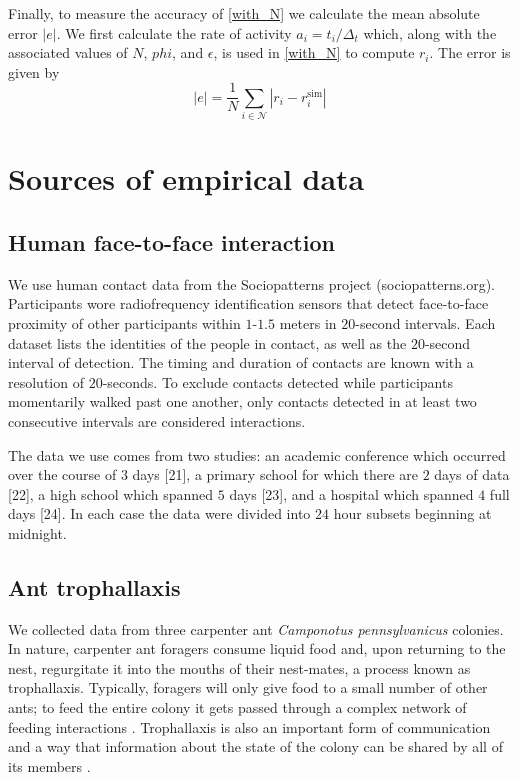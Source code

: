 \documentclass[twocolumn,8pt]{article}
\begin{document}
Finally, to measure the accuracy of \eqref{with_N} we calculate the mean absolute error $|e|$. We first calculate the rate of activity $a_{i}=t_{i}/\Delta_{t}$ which, along with the associated values of $N$, $phi$, and $\epsilon$, is used in \eqref{with_N} to compute $r_{i}$. The error is given by 
\begin{equation}
|e|=\frac{1}{N}\sum_{i\in\mathcal{N}}|r_{i}-r_{i}^{\text{sim}}|
\end{equation}

\section{Sources of empirical data}
\label{data}
\subsection{Human face-to-face interaction}
We use human contact data from the Sociopatterns project (sociopatterns.org). Participants wore radiofrequency identification sensors that detect face-to-face proximity of other participants within $1$-$1.5$ meters in $20$-second intervals. Each dataset lists the identities of the people in contact, as well as the $20$-second interval of detection. The timing and duration of contacts are known with a resolution of $20$-seconds. To exclude contacts detected while participants momentarily walked past one another, only contacts detected in at least two consecutive intervals are considered interactions.

The data we use comes from two studies: an academic conference which occurred over the course of $3$ days [21], a primary school for which there are $2$ days of data [22], a high school which spanned $5$ days [23], and a hospital which spanned $4$ full days [24]. In each case the data were divided into $24$ hour subsets beginning at midnight.

\subsection{Ant trophallaxis}
We collected data from three carpenter ant \emph{Camponotus pennsylvanicus} colonies. In nature, carpenter ant foragers consume liquid food and, upon returning to the nest, regurgitate it into the mouths of their nest-mates, a process known as trophallaxis. Typically, foragers will only give food to a small number of other ants; to feed the entire colony it gets passed through a complex network of feeding interactions \cite{quevillon2015social}. Trophallaxis is also an important form of communication and a way that information about the state of the colony can be shared by all of its members \cite{greenwald2015ant,10.7554/eLife.20375}.
\end{document}
